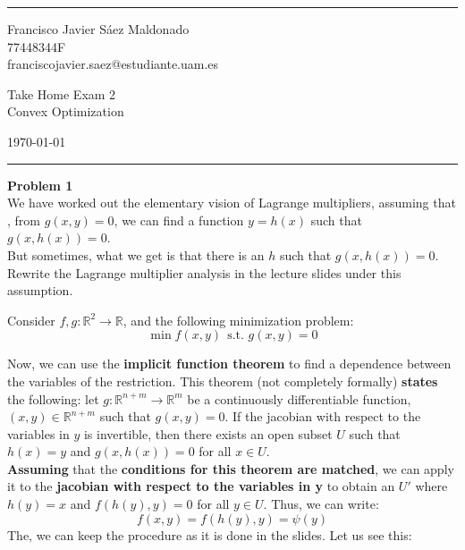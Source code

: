 \documentclass[a4paper]{article}
\newenvironment{problem}[2][Problem]
    { \begin{mdframed}[backgroundcolor=gray!20] \textbf{#1 #2} \\}
    {  \end{mdframed}}
\newcommand{\R}{\mathbb R}
\begin{document}

\fancyhead[C]{}
\hrule \medskip %
\begin{minipage}{0.295\textwidth}
\raggedright
\footnotesize
Francisco Javier Sáez Maldonado \hfill\\
77448344F \hfill\\
franciscojavier.saez@estudiante.uam.es
\end{minipage}
\begin{minipage}{0.4\textwidth}
\centering
\large
Take Home Exam 2\\
\normalsize
Convex Optimization\\
\end{minipage}
\begin{minipage}{0.295\textwidth}
\raggedleft
\today\hfill\\
\end{minipage}
\medskip\hrule
\bigskip


\begin{problem}{1}
We have worked out the elementary vision of Lagrange multipliers, assuming that , from \(g(x,y) = 0\), we can find a function \(y = h(x)\) such that \(g(x,h(x)) = 0\).\\

But sometimes, what we get is that there is an \(h\) such that \(g(x,h(x)) = 0\). Rewrite the Lagrange multiplier analysis in the lecture slides under this assumption.
\end{problem}

Consider \(f,g:\R^2 \to \R\), and the following minimization problem:
\begin{equation}
\min f(x,y) \ \ \text{s.t.  } g(x,y) = 0 
\end{equation}

Now, we can use the \textbf{implicit function theorem} to find a dependence between the variables of the restriction. This theorem (not completely formally) \textbf{states} the following: let \(g:\R^{n+m} \to \R^m\) be a continuously differentiable function, \((x,y) \in \R^{n+m}\) such that \(g(x,y) = 0\). If the jacobian with respect to the variables in \(y\) is invertible, then there exists an open subset \(U\) such that \(h(x) = y\) and \(g(x,h(x)) = 0\) for all \(x \in U\). \\

\textbf{Assuming} that the \textbf{conditions for this theorem are matched}, we can apply it to the \textbf{jacobian with respect to the variables in y} to obtain an \(U'\) where \(h(y) = x\) and \(f(h(y),y) = 0\) for all \(y \in U\). Thus, we can write:
\[
f(x,y) = f(h(y),y) =  \psi(y) 
\]
The, we can keep the procedure as it is done in the slides. Let us see this:\\
\end{document}
